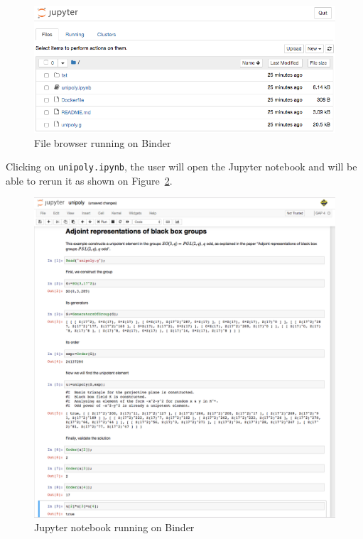 \begin{figure}[!ht]
    \centering
    \includegraphics[width=\textwidth]{images/unipoly-files}
    \caption{File browser running on Binder}
    \label{fig:unipoly-files}
\end{figure}

Clicking on {\tt unipoly.ipynb}, the user will open the Jupyter notebook
and will be able to rerun it as shown on Figure~\ref{fig:unipoly-notebook}.

\begin{figure}[!ht]
    \centering
    \includegraphics[width=\textwidth]{images/unipoly-notebook}
    \caption{Jupyter notebook running on Binder}
    \label{fig:unipoly-notebook}
\end{figure}

